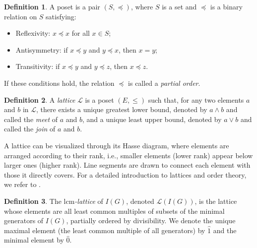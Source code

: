 \documentclass[11pt]{amsart}
\newcommand{\lcm}{\mathrm{lcm}}
\newcommand{\LC}{\mathcal{L}}
\theoremstyle{plain}
\numberwithin{lemma}{\DefaultNumberTheoremWithin}
\numberwithin{claim}{\DefaultNumberTheoremWithin}
\numberwithin{theorem}{\DefaultNumberTheoremWithin}
\numberwithin{corollary}{\DefaultNumberTheoremWithin}
\numberwithin{proposition}{\DefaultNumberTheoremWithin}
\numberwithin{conjecture}{\DefaultNumberTheoremWithin}
\theoremstyle{definition}
\newtheorem{definition}{Definition}
\numberwithin{definition}{\DefaultNumberTheoremWithin}
\theoremstyle{definition}
\numberwithin{question}{\DefaultNumberTheoremWithin}
\theoremstyle{definition}
\numberwithin{problem}{\DefaultNumberTheoremWithin}
\theoremstyle{remark}
\newtheorem{remark}{Remark}
\numberwithin{remark}
     {\DefaultNumberTheoremWithin}
\theoremstyle{remark}
\numberwithin{example}{\DefaultNumberTheoremWithin}
\begin{document}

\begin{definition}
     A poset is a pair $(S, \preceq)$, where $S$ is a set and $\preceq$ is a binary relation on $S$ satisfying:
\begin{itemize}
      \item {Reflexivity:} $x \preceq x$ for all $x \in S$;
     \item {Antisymmetry:} if $x \preceq y$ and $y \preceq x$, then $x = y$;
     \item {Transitivity:} if $x \preceq y$ and $y \preceq z$, then $x \preceq z$.
\end{itemize}
If these conditions hold, the relation $\preceq$ is called a \emph{partial order}.
\end{definition} 
  
\begin{definition}
     A \emph{lattice} $\LC$ is a poset $(E, \leq)$ such that, for any two elements $a$ and $b$ in $\LC$, there exists a unique greatest lower bound, denoted by $a \wedge b$ and called the \emph{meet} of $a$ and $b$, and a unique least upper bound, denoted by $a \vee b$ and called the \emph{join} of $a$ and $b$.
\end{definition}
     A lattice can be visualized through its Hasse diagram, where elements are arranged according to their rank, i.e., smaller elements (lower rank) appear below larger ones (higher rank). Line segments are drawn to connect each element with those it directly covers. For a detailed introduction to lattices and order theory, we refer to \cite{BirkhoffG1967,DaveyPristley2002}. 
\begin{definition}
     The \emph{$\lcm$-lattice} of $I(G)$, denoted $\LC(I(G))$, is the lattice whose elements are all least common multiples of subsets of the minimal generators of $I(G)$, partially ordered by divisibility. We denote the unique maximal element (the least common multiple of all generators) by $\hat{1}$ and the minimal element by $\hat{0}$.
\end{definition}
%
\end{document}
